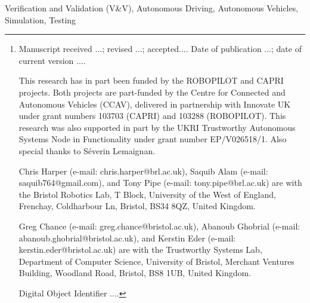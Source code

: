\documentclass[letterpaper, 10 pt, journal, twoside]{IEEEtran}
\begin{document}
\author{Chris Harper, Greg Chance, Abanoub Ghobrial, Saquib Alam, Kerstin Eder, Tony Pipe 
\thanks{{\footnotesize
Manuscript  
received ...;
revised ...;  
accepted.... 
Date of publication ...;
date of current version ....

This research has in part been funded by the ROBOPILOT and CAPRI projects. Both projects are part-funded by the Centre for Connected and Autonomous Vehicles (CCAV), delivered in partnership with Innovate UK under grant numbers 103703 (CAPRI) and 103288 (ROBOPILOT). This research was also supported in part by the UKRI Trustworthy Autonomous Systems Node in Functionality under grant number EP/V026518/1. Also special thanks to S\'everin Lemaignan.


Chris Harper (e-mail: chris.harper@brl.ac.uk),
Saquib Alam (e-mail: saquib764@gmail.com),
and
Tony Pipe (e-mail: tony.pipe@brl.ac.uk) 
are with the Bristol Robotics Lab, T Block, University of the West of England, Frenchay, Coldharbour Ln, Bristol, BS34 8QZ, United Kingdom. 

Greg Chance (e-mail: greg.chance@bristol.ac.uk), 
Abanoub Ghobrial (e-mail: abanoub.ghobrial@bristol.ac.uk), 
and 
Kerstin Eder (e-mail: kerstin.eder@bristol.ac.uk) 
are with the Trustworthy Systems Lab, Department of Computer Science, University of Bristol, Merchant Ventures Building, Woodland Road, Bristol, BS8 1UB, United Kingdom. 

Digital Object Identifier ....
}}}
%
%
\maketitle

\begin{abstract}
\noindent 

\end{abstract}

\begin{IEEEkeywords}
Verification and Validation (V\&V), Autonomous Driving, Autonomous Vehicles, Simulation, Testing
\end{IEEEkeywords}
\IEEEpeerreviewmaketitle 
\end{document}
